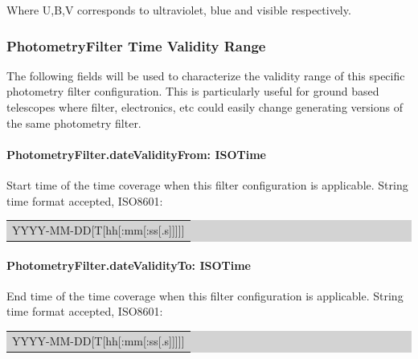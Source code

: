 \documentclass[11pt,a4paper]{ivoa}
\begin{document}

Where U,B,V corresponds to ultraviolet, blue and visible respectively.
\par

\subsubsection{PhotometryFilter Time Validity Range}
The following fields will be used to characterize the validity range of this specific photometry filter configuration. This is particularly useful for ground based telescopes where filter, electronics, etc could easily change generating versions of the same photometry filter.
\par

\paragraph{PhotometryFilter.dateValidityFrom: ISOTime}
Start time of the time coverage when this filter configuration is applicable. String time format accepted, ISO8601:\par

\bigskip
\par
\begingroup\setlength{\fboxsep}{0pt}
\colorbox{lightgray}{%
\begin{tabular}{|p{5.53in}|}
YYYY-MM-DD[T[hh[:mm[:ss[.s]]]]]
\end{tabular}%
}\endgroup
\par
\bigskip



\paragraph{PhotometryFilter.dateValidityTo: ISOTime}
End time of the time coverage when this filter configuration is applicable. String time format accepted, ISO8601:\par


\bigskip
\par
\begingroup\setlength{\fboxsep}{0pt}
\colorbox{lightgray}{%
\begin{tabular}{|p{5.53in}|}
YYYY-MM-DD[T[hh[:mm[:ss[.s]]]]]
\end{tabular}%
}\endgroup
\par
\bigskip
\end{document}
